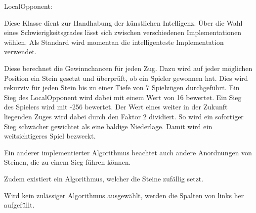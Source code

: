 LocalOpponent:

Diese Klasse dient zur Handhabung der künstlichen 
Intelligenz. Über die Wahl eines
Schwierigkeitsgrades lässt sich zwischen 
verschiedenen Implementationen wählen. Als Standard
wird momentan die intelligenteste Implementation 
verwendet.

Diese berechnet die Gewinnchancen für jeden Zug. 
Dazu wird auf jeder möglichen Position ein Stein
gesetzt und überprüft, ob ein Spieler gewonnen hat. 
Dies wird rekurviv für jeden Stein bis zu einer Tiefe 
von 7 Spielzügen durchgeführt. 
Ein Sieg des LocalOpponent wird dabei mit einem Wert 
von 16 bewertet. Ein Sieg des Spielers wird mit -256 
bewertet. 
Der Wert eines weiter in der Zukunft liegenden Zuges 
wird dabei durch den Faktor 2 dividiert. 
So wird ein sofortiger Sieg schwächer gewichtet als 
eine baldige Niederlage. Damit wird ein weitsichtigeres 
Spiel bezweckt. 

Ein anderer implementierter Algorithmus beachtet auch 
andere Anordnungen von Steinen, die zu einem Sieg 
führen können. 

Zudem existiert ein Algorithmus, welcher die Steine 
zufällig setzt. 

Wird kein zulässiger Algorithmus ausgewählt, werden 
die Spalten von links her aufgefüllt. 

